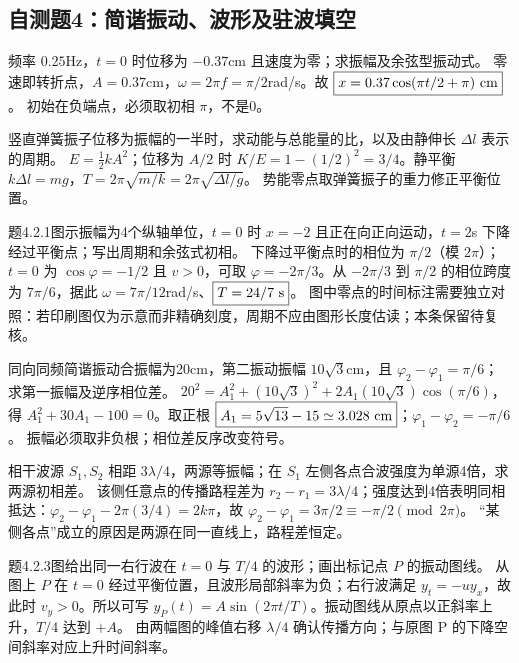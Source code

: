 \subsection{自测题4：简谐振动、波形及驻波填空}

\problemtext 频率 $0.25$Hz，$t=0$ 时位移为 $-0.37$cm 且速度为零；求振幅及余弦型振动式。
\workings 零速即转折点，$A=0.37$cm，$\omega=2\pi f=\pi/2$rad/s。故 $\boxed{x=0.37\cos(\pi t/2+\pi)\ {\rm cm}}$。
\crosscheck 初始在负端点，必须取初相 $\pi$，不是0。

\problemtext 竖直弹簧振子位移为振幅的一半时，求动能与总能量的比，以及由静伸长 $\Delta l$ 表示的周期。
\workings $E=\frac12kA^2$；位移为 $A/2$ 时 $K/E=1-(1/2)^2=\boxed{3/4}$。静平衡 $k\Delta l=mg$，$T=2\pi\sqrt{m/k}=\boxed{2\pi\sqrt{\Delta l/g}}$。
\crosscheck 势能零点取弹簧振子的重力修正平衡位置。

\problemtext 题4.2.1图示振幅为4个纵轴单位，$t=0$ 时 $x=-2$ 且正在向正向运动，$t=2$s 下降经过平衡点；写出周期和余弦式初相。
\workings 下降过平衡点时的相位为 $\pi/2$（模 $2\pi$）；$t=0$ 为 $\cos\varphi=-1/2$ 且 $v>0$，可取 $\varphi=-2\pi/3$。从 $-2\pi/3$ 到 $\pi/2$ 的相位跨度为 $7\pi/6$，据此 $\omega=7\pi/12$rad/s、$\boxed{T=24/7\ {\rm s}}$。
\crosscheck 图中零点的时间标注需要独立对照：若印刷图仅为示意而非精确刻度，周期不应由图形长度估读；本条保留待复核。

\problemtext 同向同频简谐振动合振幅为20cm，第二振动振幅 $10\sqrt3$cm，且 $\varphi_2-\varphi_1=\pi/6$；求第一振幅及逆序相位差。
\workings $20^2=A_1^2+(10\sqrt3)^2+2A_1(10\sqrt3)\cos(\pi/6)$，得 $A_1^2+30A_1-100=0$。取正根 $\boxed{A_1=5\sqrt{13}-15\simeq3.028\ {\rm cm}}$；$\boxed{\varphi_1-\varphi_2=-\pi/6}$。
\crosscheck 振幅必须取非负根；相位差反序改变符号。

\problemtext 相干波源 $S_1,S_2$ 相距 $3\lambda/4$，两源等振幅；在 $S_1$ 左侧各点合波强度为单源4倍，求两源初相差。
\workings 该侧任意点的传播路程差为 $r_2-r_1=3\lambda/4$；强度达到4倍表明同相抵达：$\varphi_2-\varphi_1-2\pi(3/4)=2k\pi$，故 $\boxed{\varphi_2-\varphi_1=3\pi/2\equiv-\pi/2\pmod{2\pi}}$。
\crosscheck “某侧各点”成立的原因是两源在同一直线上，路程差恒定。

\problemtext 题4.2.3图给出同一右行波在 $t=0$ 与 $T/4$ 的波形；画出标记点 $P$ 的振动图线。
\workings 从图上 $P$ 在 $t=0$ 经过平衡位置，且波形局部斜率为负；右行波满足 $y_t=-u y_x$，故此时 $v_y>0$。所以可写 $\boxed{y_P(t)=A\sin(2\pi t/T)}$。振动图线从原点以正斜率上升，$T/4$ 达到 $+A$。
\crosscheck 由两幅图的峰值右移 $\lambda/4$ 确认传播方向；与原图 P 的下降空间斜率对应上升时间斜率。

